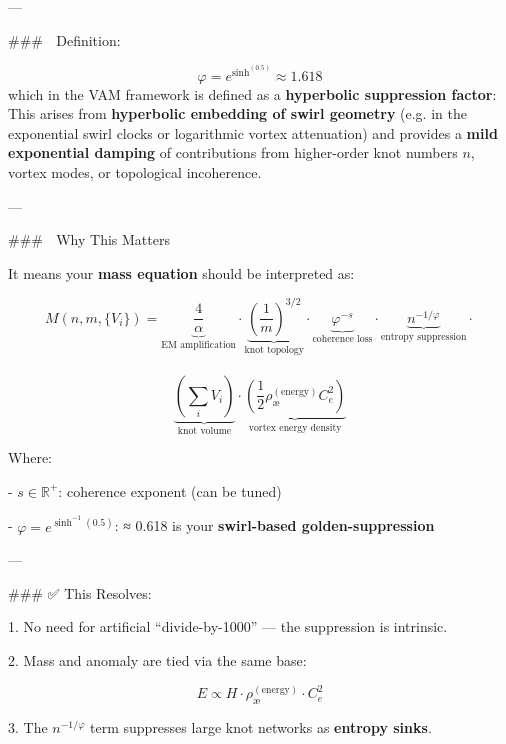 \documentclass[11pt]{article}
\begin{document}
    ---

    ### 📐 Definition:

    $$
    \varphi = e^{\sinh^{(0.5)}} \approx 1.618
    $$
    which in the VAM framework is defined  as a \textbf{hyperbolic suppression factor}:
    This arises from \textbf{hyperbolic embedding of swirl geometry} (e.g. in the exponential swirl clocks or logarithmic vortex attenuation) and provides a \textbf{mild exponential damping} of contributions from higher-order knot numbers $n$, vortex modes, or topological incoherence.

    ---

    ### 🧠 Why This Matters

    It means your \textbf{mass equation} should be interpreted as:


    $$ M(n, m, \{V_i\}) = \underbrace{\frac{4}{\alpha}}_{\text{EM amplification}} \cdot  \underbrace{\left( \frac{1}{m} \right)^{3/2}}_{\text{knot topology}} \cdot  \underbrace{\varphi^{-s}}_{\text{coherence loss}} \cdot \underbrace{n^{-1/\varphi}}_{\text{entropy suppression}} \cdot $$\\
    $$ \underbrace{\left( \sum_i V_i \right)}_{\text{knot volume}} \cdot  \underbrace{\left( \frac{1}{2} \rho_\text{\ae}^{(\text{energy})} C_e^2 \right)}_{\text{vortex energy density}}
    $$

    Where:

    -   $s \in \mathbb{R}^{+}$: coherence exponent (can be tuned)

    -   $\varphi = e^{\sinh^{-1}(0.5)}$: ≈ 0.618 is your \textbf{swirl-based golden-suppression}


    ---

    ### ✅ This Resolves:

    1.  No need for artificial “divide-by-1000” — the suppression is intrinsic.

    2.  Mass and anomaly are tied via the same base:

    $$
    E \propto H \cdot \rho_\text{\ae}^{(\text{energy})} \cdot C_e^2
    $$

    3.  The $n^{-1/\varphi}$ term suppresses large knot networks as \textbf{entropy sinks}.
\end{document}
